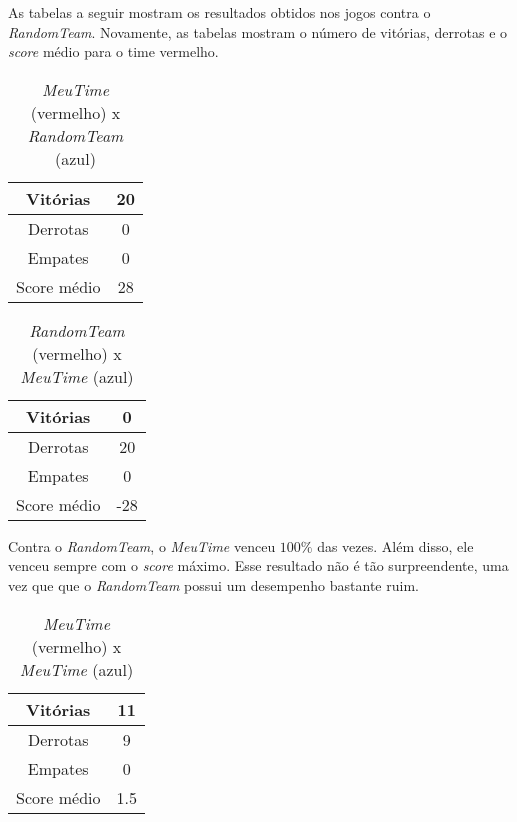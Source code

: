 \documentclass[a4paper,12pt]{article}
\begin{document}
As tabelas a seguir mostram os resultados obtidos nos jogos contra o \textit{RandomTeam}.
Novamente, as tabelas mostram o número de vitórias, derrotas e o \textit{score} médio
para o time vermelho.

\begin{table}[htb!]
    {\centering
    \begin{tabular}{|c|c|} \hline
    Vitórias     & 20 \\ \hline
    Derrotas     & 0  \\ \hline
    Empates      & 0  \\ \hline
    Score médio  & 28 \\ \hline
    \end{tabular}
    \caption{\textit{MeuTime} (vermelho) x \textit{RandomTeam} (azul)}
    }
\end{table}

\begin{table}[htb!]
    {\centering
    \begin{tabular}{|c|c|} \hline
    Vitórias     & 0   \\ \hline
    Derrotas     & 20  \\ \hline
    Empates      & 0   \\ \hline
    Score médio  & -28 \\ \hline
    \end{tabular}
    \caption{\textit{RandomTeam} (vermelho) x \textit{MeuTime} (azul)}
    }
\end{table}

Contra o \textit{RandomTeam}, o \textit{MeuTime} venceu $100\%$ das vezes. Além disso,
ele venceu sempre com o \textit{score} máximo. Esse resultado não é tão surpreendente,
uma vez que que o \textit{RandomTeam} possui um desempenho bastante ruim.


\begin{table}[htb!]
    {\centering
    \begin{tabular}{|c|c|} \hline
    Vitórias     & 11  \\ \hline
    Derrotas     & 9   \\ \hline
    Empates      & 0   \\ \hline
    Score médio  & 1.5 \\ \hline
    \end{tabular}
    \caption{\textit{MeuTime} (vermelho) x \textit{MeuTime} (azul)}
    }
\end{table}
\end{document}
